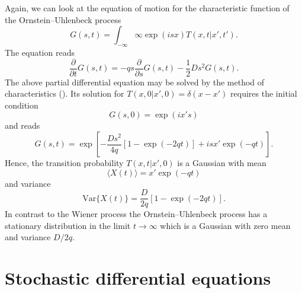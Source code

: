 Again, we can look at the equation of motion for the characteristic
function of the Ornstein--Uhlenbeck process
\begin{equation*}
G(s,t) = \int_{-\infty}{\infty} \exp(isx) T(x,t|x',t').
\end{equation*}
The equation reads
\begin{equation*}
\frac{\partial}{\partial t}G(s,t) = -qs \frac{\partial}{\partial s} 
G(s,t) - \frac{1}{2} Ds^2 G(s,t).
\end{equation*}
The above partial differential equation may be solved by the 
method of characteristics (\cite{GARDINER}). Its solution
for $T(x,0|x',0)=\delta(x-x')$ requires the
initial condition 
\begin{equation*}
G(s,0) = \exp(ix's)
\end{equation*}
and reads
\begin{equation*}
G(s,t) = \exp\left[ -\frac{Ds^2}{4q}[1-\exp(-2qt)] + isx'\exp(-qt) 
\right].
\end{equation*}
Hence, the transition probability $T(x,t|x',0)$ is a Gaussian
with mean
\begin{equation*}
\langle X(t) \rangle = x'\exp(-qt)
\end{equation*}
and variance
\begin{equation}
\text{Var} \{ X(t) \} = \frac{D}{2q} [1- \exp(-2qt)].
\end{equation}
In contrast to the Wiener process the Ornstein--Uhlenbeck process
has a stationary distribution in the limit $t\longrightarrow \infty$
which is a Gaussian with zero mean and variance $D/2q$.


\section{Stochastic differential equations}

